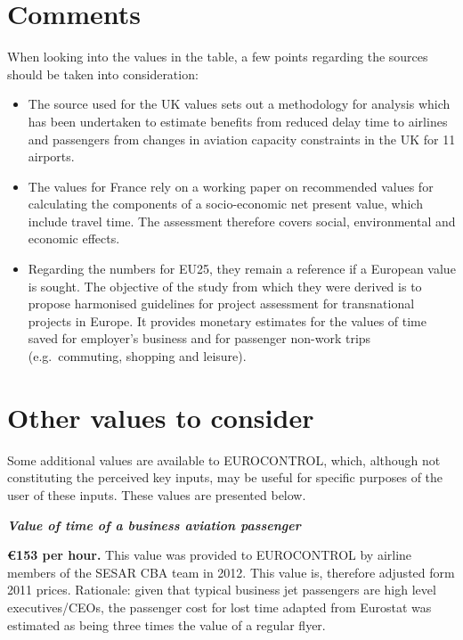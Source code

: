 \documentclass[
  11pt,
  a4paper,
]{book}
\begin{document}
\hypertarget{comments-4}{%
\section{Comments}\label{comments-4}}

When looking into the values in the table, a few points regarding the
sources should be taken into consideration:

\begin{itemize}
\item
  The source used for the UK values sets out a methodology for analysis
  which has been undertaken to estimate benefits from reduced delay time
  to airlines and passengers from changes in aviation capacity
  constraints in the UK for 11 airports.
\item
  The values for France rely on a working paper on recommended values
  for calculating the components of a socio-economic net present value,
  which include travel time. The assessment therefore covers social,
  environmental and economic effects.
\item
  Regarding the numbers for EU25, they remain a reference if a European
  value is sought. The objective of the study from which they were
  derived is to propose harmonised guidelines for project assessment for
  transnational projects in Europe. It provides monetary estimates for
  the values of time saved for employer's business and for passenger
  non-work trips (e.g.~commuting, shopping and leisure).
\end{itemize}

\hypertarget{other-values-to-consider}{%
\section{Other values to consider}\label{other-values-to-consider}}

Some additional values are available to EUROCONTROL, which, although not
constituting the perceived key inputs, may be useful for specific
purposes of the user of these inputs. These values are presented below.

\textbf{\emph{Value of time of a business aviation passenger}}

\textbf{€153 per hour.} This value was provided to EUROCONTROL by
airline members of the SESAR CBA team in 2012. This value is, therefore
adjusted form 2011 prices. Rationale: given that typical business jet
passengers are high level executives/CEOs, the passenger cost for lost
time adapted from Eurostat was estimated as being three times the value
of a regular flyer.
\end{document}

